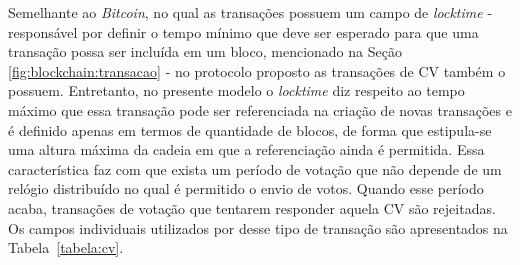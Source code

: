 %
Semelhante ao \textit{Bitcoin}, no qual as transações possuem um campo de \textit{locktime} - responsável por definir o tempo mínimo que deve ser esperado para que uma transação possa ser incluída em um bloco, mencionado na Seção \ref{fig:blockchain:transacao} - no protocolo proposto as transações de \ac{CV} também o possuem. Entretanto, no presente modelo o \textit{locktime} diz respeito ao tempo máximo que essa transação pode ser referenciada na criação de novas transações e é definido apenas em termos de quantidade de blocos, de forma que estipula-se uma altura máxima da cadeia em que a referenciação ainda é permitida. Essa característica faz com que exista um período de votação que não depende de um relógio distribuído no qual é permitido o envio de votos. Quando esse período acaba, transações de votação que tentarem responder aquela \ac{CV} são rejeitadas. Os campos individuais utilizados por desse tipo de transação são apresentados na Tabela~\ref{tabela:cv}.

